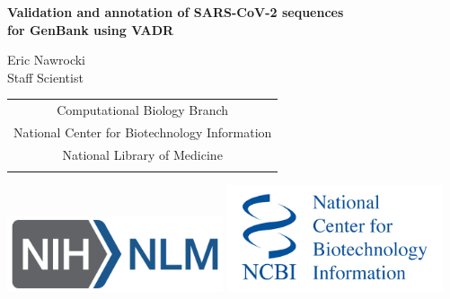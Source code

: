 \documentclass[landscape]{slides}
\begin{document}
\begin{slide}
\begin{center}
\large{\textbf{Validation and annotation of SARS-CoV-2 sequences \\ for GenBank using VADR}}

\normalsize

Eric Nawrocki \\
Staff Scientist \\

\medskip

\medskip

\medskip

\medskip

\medskip

\small
\begin{tabular}{c}
Computational Biology Branch \\
National Center for Biotechnology Information\\
National Library of Medicine \\
\\
\end{tabular}

\vspace{0.1in}

\includegraphics[width=2.5in]{figs/NIH_NLM_ABRV_2C_4-white}
\includegraphics[width=2.5in]{figs/ncbi-logo}

\end{center}
\end{slide}
\end{document}
